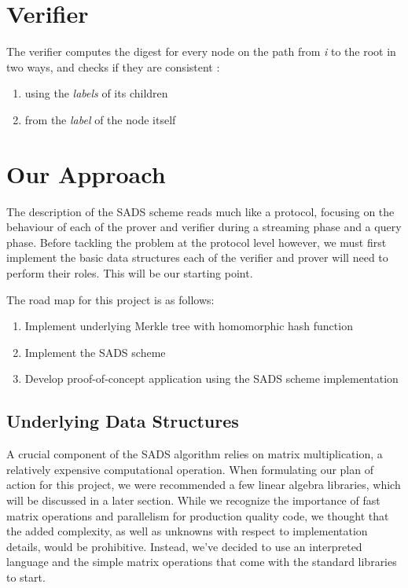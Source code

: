 \documentclass[11pt, letterpaper, oneside]{article}
\begin{document}
	
	\section{Verifier}
	
	The verifier computes the digest for every node on the path from \textit{i} to the root in two ways, and checks
	if they are consistent :
	
	\begin{enumerate}
	 \item using the \textit{labels} of its children
	 \item from the \textit{label} of the node itself
	\end{enumerate}

	
	\section{Our Approach}
	
	The description of the SADS scheme reads much like a protocol, focusing on the behaviour of each of the prover and verifier during a streaming phase and a query phase.
	Before tackling the problem at the protocol level however, we must first implement the basic data structures each of the verifier and prover will need to perform their roles.
	This will be our starting point.

	The road map for this project is as follows:
	\begin{enumerate}
	\item Implement underlying Merkle tree with homomorphic hash function
	\item Implement the SADS scheme
	\item Develop proof-of-concept application using the SADS scheme implementation
	\end{enumerate}

	\subsection{Underlying Data Structures}

	A crucial component of the SADS algorithm relies on matrix multiplication, a relatively expensive computational operation.
	When formulating our plan of action for this project, we were recommended a few linear algebra libraries, which will be discussed in a later section.
	While we recognize the importance of fast matrix operations and parallelism for production quality code, we thought that the added complexity, as well as unknowns with respect to implementation details, would be prohibitive.
	Instead, we've decided to use an interpreted language and the simple matrix operations that come with the standard libraries to start.
\end{document}
